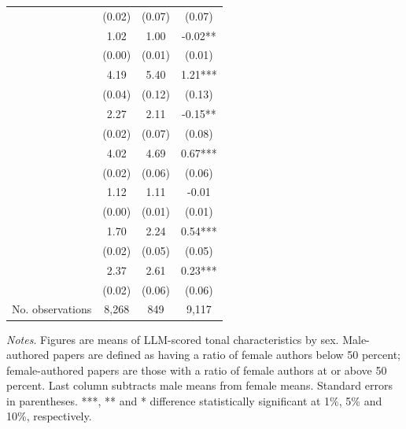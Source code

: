 \begin{table}
\begin{threeparttable}
\begin{tabular}{p{5cm}S@{}S@{}S@{}}
                                          &      (0.02)&      (0.07)&      (0.07)   \\
            &        1.02&        1.00&       -0.02** \\
                                          &      (0.00)&      (0.01)&      (0.01)   \\
            &        4.19&        5.40&        1.21***\\
                                          &      (0.04)&      (0.12)&      (0.13)   \\
            &        2.27&        2.11&       -0.15** \\
                                          &      (0.02)&      (0.07)&      (0.08)   \\
            &        4.02&        4.69&        0.67***\\
                                          &      (0.02)&      (0.06)&      (0.06)   \\
             &        1.12&        1.11&       -0.01   \\
                                          &      (0.00)&      (0.01)&      (0.01)   \\
            &        1.70&        2.24&        0.54***\\
                                          &      (0.02)&      (0.05)&      (0.05)   \\
            &        2.37&        2.61&        0.23***\\
                                          &      (0.02)&      (0.06)&      (0.06)   \\
            \midrule
            No. observations              &       8,268&         849&       9,117   \\
            \bottomrule
        \end{tabular}
        \begin{tablenotes}
            \tiny
            \item \textit{Notes}. Figures are means of LLM-scored tonal characteristics by sex. Male-authored papers are defined as having a ratio of female authors below 50 percent; female-authored papers are those with a ratio of female authors at or above 50 percent. Last column subtracts male means from female means. Standard errors in parentheses. ***, ** and * difference statistically significant at 1\%, 5\% and 10\%, respectively.
        \end{tablenotes}
    \end{threeparttable}
\end{table}
